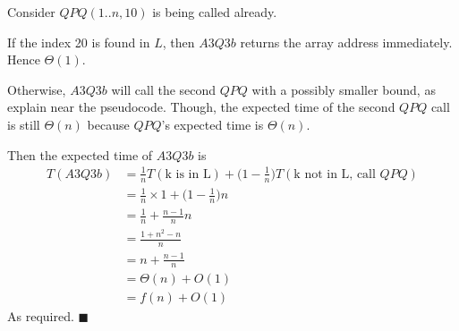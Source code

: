 \documentclass[12pt]{article}
\begin{document}
\begin{enumerate}[(a)]
Consider $QPQ(1..n,10)$ is being called already.

If the index 20 is found in $L$, then $A3Q3b$ returns the array address immediately.
Hence $\Theta(1)$.

Otherwise, $A3Q3b$ will call the second $QPQ$ with a possibly smaller bound, as explain near the pseudocode.
Though, the expected time of the second $QPQ$ call is still $\Theta(n)$ because $QPQ$'s expected time is $\Theta(n)$.

Then the expected time of $A3Q3b$ is
\begin{align*}
T(A3Q3b) &= \frac{1}{n}T(\text{k is in L}) + \big (1-\frac{1}{n} \big ) T(\text{k not in L, call $QPQ$})\\
	&= \frac{1}{n} \times 1 + \big (1-\frac{1}{n} \big ) n\\
	&= \frac{1}{n} + \frac{n-1}{n} n\\
	&= \frac{1 + n^2 -n}{n}\\
	&= n + \frac{n-1}{n}\\
	&= \Theta(n) + O(1)\\
	&= f(n) + O(1)
\end{align*}
As required.
\hfill $\blacksquare$

\end{enumerate}
\end{document}
